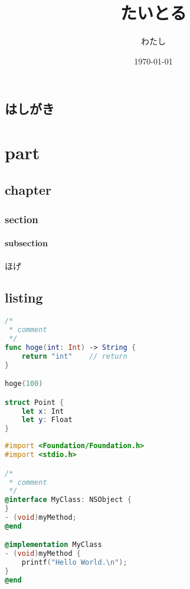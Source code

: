 \documentclass[10pt,twoside,openright]{jsbook}
\title{たいとる}
\author{わたし}
\date{\today}
\newcommand\blankpage{%
    \null
    \thispagestyle{empty}
    \addtocounter{page}{-1}
    \newpage
}
\begin{document}
\maketitle
\restoregeometry

\afterpage{\blankpage}


\tableofcontents
\thispagestyle{plain}

\chapter*{はしがき}
\thispagestyle{plain}


\cleardoublepage
{}


\part{part}
\restoregeometry

\chapter{chapter}
\thispagestyle{plain}
\section{section}
\subsection{subsection}
ほげ\cite{hoge}
\chapter{listing}
\thispagestyle{plain}
\begin{lstlisting}[language=swift,caption=キャプション,label=ラベル]
/*
 * comment
 */
func hoge(int: Int) -> String {
    return "int"    // return
}

hoge(100)

struct Point {
    let x: Int
    let y: Float
}
\end{lstlisting}
\begin{lstlisting}[language=objectivec,caption=キャプション,label=ラベル]
#import <Foundation/Foundation.h>
#import <stdio.h>

/*
 * comment
 */
@interface MyClass: NSObject {
}
- (void)myMethod;
@end

@implementation MyClass
- (void)myMethod {
    printf("Hello World.\n");
}
@end
\end{lstlisting}
\end{document}
